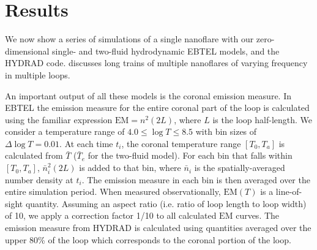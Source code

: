 \documentclass[apj]{emulateapj}
\begin{document}
	\section{Results}
	\label{sec:results}
	\par We now show a series of simulations of a single nanoflare with our zero-dimensional single- and two-fluid hydrodynamic EBTEL models, and the HYDRAD code.  discusses long trains of multiple nanoflares of varying frequency in multiple loops.
	\par An important output of all these models is the coronal emission measure. In EBTEL the emission measure for the entire coronal part of the loop is calculated using the familiar expression $\mathrm{EM}=n^2(2L)$, where $L$ is the loop half-length. We consider a temperature range of $4.0\le\log{T}\le8.5$ with bin sizes of $\Delta\log{T}=0.01$. At each time $t_i$, the coronal temperature range $[T_0,T_a]$ is calculated from $\bar{T}$ ($\bar{T}_e$ for the two-fluid model). For each bin that falls within $[T_0,T_a]$, $\bar{n}_i^2(2L)$ is added to that bin, where $\bar{n}_i$ is the spatially-averaged number density at $t_i$. The emission measure in each bin is then averaged over the entire simulation period. When measured observationally, $\mathrm{EM}(T)$ is a line-of-sight quantity. Assuming an aspect ratio (i.e. ratio of loop length to loop width) of 10, we apply a correction factor 1/10 to all calculated $\mathrm{EM}$ curves. The emission measure from HYDRAD is calculated using quantities averaged over the upper 80\% of the loop which corresponds to the coronal portion of the loop.
\end{document}
